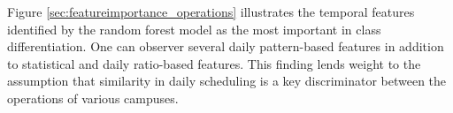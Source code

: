 Figure \ref{sec:featureimportance_operations} illustrates the temporal features identified by the random forest model as the most important in class differentiation. One can observer several daily pattern-based features in addition to statistical and daily ratio-based features. This finding lends weight to the assumption that similarity in daily scheduling is a key discriminator between the operations of various campuses.